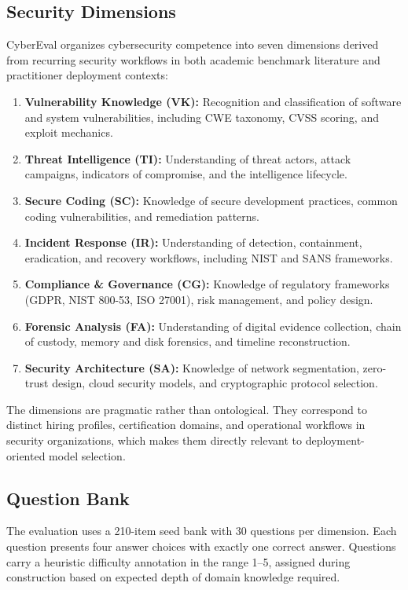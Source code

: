 \documentclass[final]{elsarticle}
\begin{document}
\subsection{Security Dimensions}

CyberEval organizes cybersecurity competence into seven dimensions derived from recurring security workflows in both academic benchmark literature and practitioner deployment contexts:

\begin{enumerate}
    \item \textbf{Vulnerability Knowledge (VK):} Recognition and classification of software and system vulnerabilities, including CWE taxonomy, CVSS scoring, and exploit mechanics.
    \item \textbf{Threat Intelligence (TI):} Understanding of threat actors, attack campaigns, indicators of compromise, and the intelligence lifecycle.
    \item \textbf{Secure Coding (SC):} Knowledge of secure development practices, common coding vulnerabilities, and remediation patterns.
    \item \textbf{Incident Response (IR):} Understanding of detection, containment, eradication, and recovery workflows, including NIST and SANS frameworks.
    \item \textbf{Compliance \& Governance (CG):} Knowledge of regulatory frameworks (GDPR, NIST 800-53, ISO 27001), risk management, and policy design.
    \item \textbf{Forensic Analysis (FA):} Understanding of digital evidence collection, chain of custody, memory and disk forensics, and timeline reconstruction.
    \item \textbf{Security Architecture (SA):} Knowledge of network segmentation, zero-trust design, cloud security models, and cryptographic protocol selection.
\end{enumerate}

The dimensions are pragmatic rather than ontological. They correspond to distinct hiring profiles, certification domains, and operational workflows in security organizations, which makes them directly relevant to deployment-oriented model selection.

\subsection{Question Bank}

The evaluation uses a 210-item seed bank with 30 questions per dimension. Each question presents four answer choices with exactly one correct answer. Questions carry a heuristic difficulty annotation in the range 1--5, assigned during construction based on expected depth of domain knowledge required.
\end{document}
